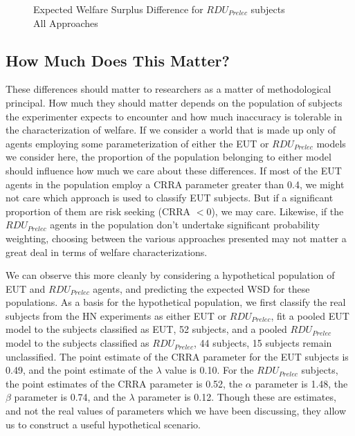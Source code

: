\documentclass[../main.tex]{subfiles}
\begin{document}
\begin{figure}[h!]
	\center
	\caption{Expected Welfare Surplus Difference for $\mathit{RDU_{Prelec}}$ subjects\\All Approaches}
	\label{fig:exwel-pre}
\end{figure}

\subsection{How Much Does This Matter?}

These differences should matter to researchers as a matter of methodological principal.
How much they should matter depends on the population of subjects the experimenter expects to encounter and how much inaccuracy is tolerable in the characterization of welfare.
If we consider a world that is made up only of agents employing some parameterization of either the EUT or $\mathit{RDU_{Prelec}}$ models we consider here, the proportion of the population belonging to either model should influence how much we care about these differences.
If most of the EUT agents in the population employ a CRRA parameter greater than 0.4, we might not care which approach is used to classify EUT subjects.
But if a significant proportion of them are risk seeking (CRRA $< 0$), we may care.
Likewise, if the $\mathit{RDU_{Prelec}}$ agents in the population don't undertake significant probability weighting, choosing between the various approaches presented may not matter a great deal in terms of welfare characterizations.

We can observe this more cleanly by considering a hypothetical population of EUT and $\mathit{RDU_{Prelec}}$ agents, and predicting the expected WSD for these populations.
As a basis for the hypothetical population, we first classify the real subjects from the HN experiments as either EUT or $\mathit{RDU_{Prelec}}$, fit a pooled EUT model to the subjects classified as EUT, 52 subjects, and a pooled $\mathit{RDU_{Prelec}}$ model to the subjects classified as $\mathit{RDU_{Prelec}}$, 44 subjects, 15 subjects remain unclassified.
The point estimate of the CRRA parameter for the EUT subjects is 0.49, and the point estimate of the $\lambda$ value is 0.10.
For the $\mathit{RDU_{Prelec}}$ subjects, the point estimates of the CRRA parameter is 0.52, the $\alpha$ parameter is 1.48, the $\beta$ parameter is 0.74, and the $\lambda$ parameter is 0.12.
Though these are estimates, and not the real values of parameters which we have been discussing, they allow us to construct a useful hypothetical scenario.
\end{document}
